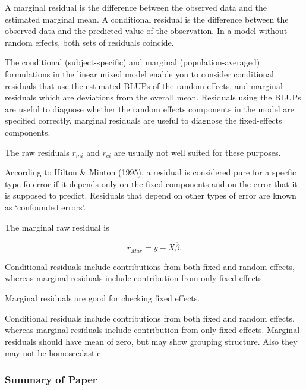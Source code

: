 \documentclass[]{report}
\begin{document}
A marginal residual is the difference between the observed data and the estimated marginal mean. A conditional residual is the difference between the observed data and the predicted value of the observation. In a model without random effects, both sets of residuals coincide.

The conditional (subject-specific) and marginal (population-averaged) formulations in the linear mixed model enable you to consider conditional residuals that use the estimated BLUPs of the random effects, and marginal residuals which are deviations from the overall mean. Residuals using the BLUPs are useful to diagnose whether the random effects components in the model are specified correctly, marginal residuals are useful to diagnose the fixed-effects components.	

The raw residuals $r_{mi}$ and $r_{ci}$ are usually not well suited for these purposes.
	
	
	
According to Hilton \& Minton (1995), a residual is considered pure for a specfic type fo error
	if it depends only on the fixed components and on the error that it is supposed to predict.
	Residuals that depend on other types of error are known as `confounded errors'.
	
	
The marginal raw residual is

\[ r_{Mar} = y - X \hat{\beta}. \]

	
	Conditional residuals include contributions from both fixed and random effects, whereas marginal residuals include contribution from only fixed effects.
	
Marginal residuals are good for checking fixed effects.	


Conditional residuals include contributions from both fixed and random effects, whereas marginal residuals include contribution from only fixed effects. Marginal residuals should have mean of zero, but may show grouping structure. Also they may not be homoscedastic.

\subsubsection{Summary of Paper}
\end{document}
